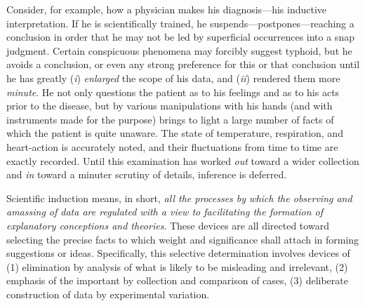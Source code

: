 \documentclass[letterpaper]{book}
\begin{document}

Consider, for example, how a physician makes his diagnosis---his
inductive interpretation. If he is scientifically trained, he
suspends---postpones---reaching a conclusion in order that he may not be
led by superficial occurrences into a snap judgment. Certain conspicuous
phenomena may forcibly suggest typhoid, but he avoids a conclusion, or
even any strong preference for this or that conclusion until he has
greatly (\emph{i}) \emph{enlarged} the scope of his data, and
(\emph{ii}) rendered them more \emph{minute}. He not only questions the
patient as to his feelings and as to his acts prior to the disease, but
by various manipulations with his hands (and with instruments made for
the purpose) brings to light a large number of facts of which the
patient is quite unaware. The state of
temperature,
respiration, and heart-action is accurately noted, and their
fluctuations from time to time are exactly recorded. Until this
examination has worked \emph{out} toward a wider collection and
\emph{in} toward a minuter scrutiny of details, inference is deferred.


Scientific induction means, in short, \emph{all the processes by which
the observing and amassing of data are regulated with a view to
facilitating the formation of explanatory conceptions and theories}.
These devices are all directed toward selecting the precise facts to
which weight and significance shall attach in forming suggestions or
ideas. Specifically, this selective determination involves devices of
(1) elimination by analysis of what is likely to be misleading and
irrelevant, (2) emphasis of the important by collection and comparison
of cases, (3) deliberate construction of data by experimental variation.

\end{document}
